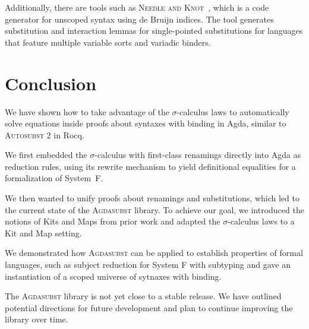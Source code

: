 \documentclass[screen,nonacm]{acmart}
\begin{document}
Additionally, there are tools such as \textsc{Needle and
      Knot}~\cite{10.1007/978-3-662-49498-1_17}, which is a code generator for
unscoped syntax using de Bruijn indices. The tool generates substitution and
interaction lemmas for single-pointed substitutions for languages that feature
multiple variable sorts and variadic binders.

\section{Conclusion}\label{sec:con}
We have shown how to take advantage of the $σ$-calculus laws to automatically
solve equations inside proofs about syntaxes with binding in Agda, similar to
\textsc{Autosubst 2} in Rocq.

We first embedded the $σ$-calculus with first-class renamings directly into
Agda as reduction rules, using its rewrite mechanism to yield definitional
equalities for a formalization of System~F.

We then wanted to unify proofs about renamings and substitutions, which led to
the current state of the \textsc{Agdasubst} library. To achieve our goal, we
introduced the notions of Kits and Maps from prior work and adapted the
$σ$-calculus laws to a Kit and Map setting.

We demonstrated how \textsc{Agdasubst} can be applied to establish properties
of formal languages, such as subject reduction for System F with subtyping and
gave an instantiation of a scoped universe of sytnaxes with binding.

The \textsc{Agdasubst} library is not yet close to a stable release. We have
outlined potential directions for future development and plan to continue
improving the library over time.



\end{document}
